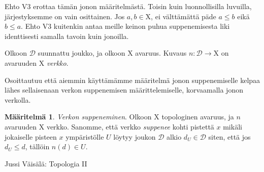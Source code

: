\documentclass[12pt,a4paper,leqno]{report}
\newcommand{\X}{\mathrm{X}}
\newcommand{\D}{\mathcal{D}}
\newcommand{\verkop}{\leq}
\theoremstyle{plain}
\theoremstyle{definition}
\newtheorem{maar}[equation]{Määritelmä}
\theoremstyle{remark}
\begin{document}
Ehto V3 erottaa tämän jonon määritelmästä. Toisin kuin luonnollisilla luvuilla, järjestyksemme on vain osittainen. Jos $a, b \in \X$, ei välttämättä päde $a \verkop b$ eikä $b \verkop a$. Ehto V3 kuitenkin antaa meille keinon puhua suppenemisesta liki identtisesti samalla tavoin kuin jonoilla.

Olkoon $\D$ suunnattu joukko, ja olkoon $\X$ avaruus. Kuvaus $n : \D \to \X$ on avaruuden $\X$ \emph{verkko}.

Osoittautuu että aiemmin käyttämämme määritelmä jonon suppenemiselle kelpaa lähes sellaisenaan verkon suppenemisen määrittelemiselle, korvaamalla jonon verkolla.

\begin{maar}\label{verksupmaar}
\emph{Verkon suppeneminen}. Olkoon $\X$ topologinen avaruus, ja $n$ avaruuden $\X$ verkko. Sanomme, että verkko \emph{suppenee} kohti pistettä $x$ mikäli jokaiselle pisteen $x$ ympäristölle $U$ löytyy joukon $\D$ alkio $d_U \in \D$ siten, että jos $d_U \verkop d$, tällöin $n(d) \in U$.
\end{maar}

\begin{thebibliography}{9}

Jussi Väisälä: Topologia II
\end{thebibliography}
\end{document}
